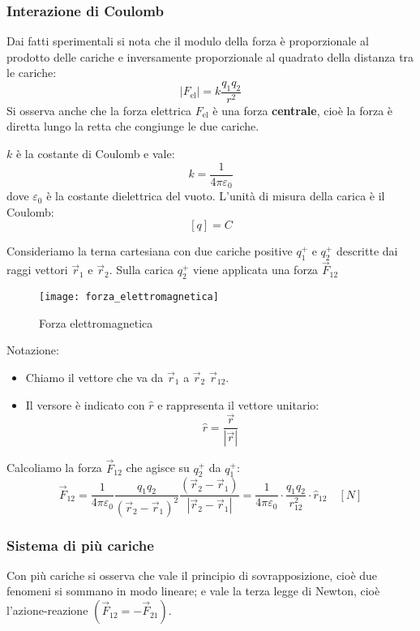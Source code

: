 \documentclass[a4paper]{article}
\begin{document}
\subsubsection{Interazione di Coulomb}
Dai fatti sperimentali si nota che il modulo della forza è proporzionale al prodotto
delle cariche e inversamente proporzionale al quadrato della distanza tra le cariche:
\[
  | F_{\text{el}} | = k \frac{q_1 q_2}{r^2}
\] 
Si osserva anche che la forza elettrica \( F_{\text{el}} \) è una forza \textbf{centrale},
cioè la forza è diretta lungo la retta che congiunge le due cariche.

\( k \) è la costante di Coulomb e vale:
\[
  k = \frac{1}{4 \pi \varepsilon_0}
\]
dove \( \varepsilon_0 \) è la costante dielettrica del vuoto.
L'unità di misura della carica è il Coulomb:
\[
  [q] = C
\] 

\vspace{1em}
\noindent
Consideriamo la terna cartesiana con due cariche positive \( q^+_1 \) e \( q^+_2 \)
descritte dai raggi vettori \( \vec{r}_1 \) e \( \vec{r}_2 \). Sulla carica \( q^+_2 \) 
viene applicata una forza \( \vec{F}_{12} \) 
\begin{figure}[H]
  \centering
	\texttt{[image: forza\_elettromagnetica]}
  \caption{Forza elettromagnetica}
\end{figure}

\noindent
Notazione: 
\begin{itemize}
  \item 
    Chiamo il vettore che va da \( \vec{r}_1 \) a \( \vec{r}_2 \) \( \vec{r}_{12} \).

  \item 
    Il versore è indicato con \( \hat{r} \) e rappresenta il vettore unitario:
    \[
      \hat{r} = \frac{\vec{r}}{|\vec{r}|}
    \] 
\end{itemize}


\vspace{1em}
\noindent
Calcoliamo la forza \( \vec{F}_{12} \) che agisce su \( q^+_2 \) da \( q^+_1 \):
\[
  \vec{F}_{12} = \frac{1}{4 \pi \varepsilon_0} \frac{q_1 q_2}{\left( \vec{r}_{2}
    - \vec{r}_1 \right)^2} \frac{\left( \vec{r}_{2} - \vec{r}_1 \right)}{|\vec{r}_{2}
  - \vec{r}_1|} = 
  \frac{1}{4 \pi \varepsilon_0} \cdot \frac{q_1 q_2}{r_{12}^2} \cdot \hat{r}_{12} \quad [N]
\] 

\subsubsection{Sistema di più cariche}
Con più cariche si osserva che vale il principio di sovrapposizione, cioè due fenomeni
si sommano in modo lineare; e vale la terza legge di Newton, cioè l'azione-reazione
\( \left( \vec{F}_{12} = - \vec{F}_{21} \right)  \).
\end{document}
